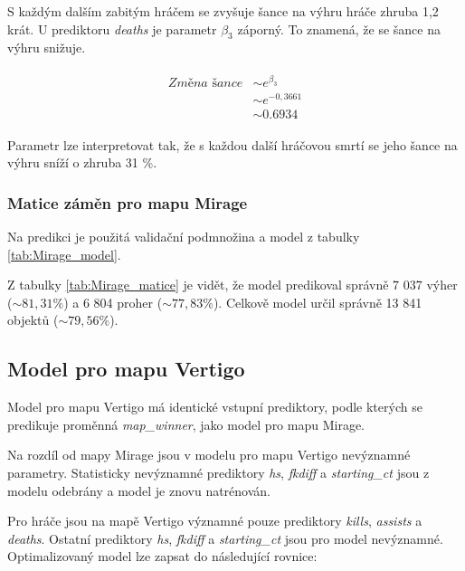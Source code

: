 S každým dalším zabitým hráčem se zvyšuje šance na výhru hráče zhruba 1,2 krát. U prediktoru \textit{deaths} je parametr $\beta_3$ záporný. To znamená, že se šance
na výhru snižuje.

\begin{align}
    \begin{split}
        \textit{Změna šance} &\sim e^{\beta_3} \\
                             &\sim e^{-0,3661} \\                     
                             &\sim 0.6934
    \end{split}
\end{align}

Parametr lze interpretovat tak, že s každou další hráčovou smrtí se jeho šance na výhru sníží o zhruba 31 \%. 

\subsubsection{Matice záměn pro mapu Mirage}
Na predikci je použitá validační podmnožina a model z tabulky \ref{tab:Mirage_model}.





Z tabulky \ref{tab:Mirage_matice} je vidět, že model predikoval správně 7 037 výher ($\sim 81,31 \%$) a 6 804 proher ($\sim 77,83 \%$).
Celkově model určil správně 13 841 objektů ($\sim 79,56 \%$).

\newpage
\subsection{Model pro mapu Vertigo}
Model pro mapu Vertigo má identické vstupní prediktory, podle kterých se predikuje proměnná \textit{map\_winner}, jako model pro mapu Mirage.



Na rozdíl od mapy Mirage jsou v modelu pro mapu Vertigo nevýznamné parametry. Statisticky nevýznamné prediktory \textit{hs}, \textit{fkdiff} a \textit{starting\_ct}
jsou z modelu odebrány a model je znovu natrénován.



Pro hráče jsou na mapě Vertigo významné pouze prediktory \textit{kills}, \textit{assists} a \textit{deaths}. Ostatní prediktory \textit{hs},
\textit{fkdiff} a \textit{starting\_ct} jsou pro model nevýznamné. Optimalizovaný model lze zapsat do následující rovnice:

